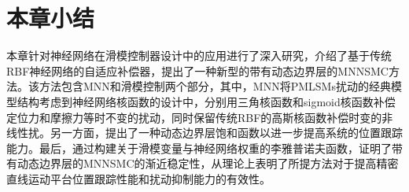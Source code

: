 \section{本章小结}
本章针对神经网络在滑模控制器设计中的应用进行了深入研究，介绍了基于传统RBF神经网络的自适应补偿器，提出了一种新型的带有动态边界层的MNNSMC方法。该方法包含MNN和滑模控制两个部分，其中，MNN将PMLSMs扰动的经典模型结构考虑到神经网络核函数的设计中，分别用三角核函数和sigmoid核函数补偿定位力和摩擦力等时不变的扰动，同时保留传统RBF的高斯核函数补偿时变的非线性扰。另一方面，提出了一种动态边界层饱和函数以进一步提高系统的位置跟踪能力。最后，通过构建关于滑模变量与神经网络权重的李雅普诺夫函数，证明了带有动态边界层的MNNSMC的渐近稳定性，从理论上表明了所提方法对于提高精密直线运动平台位置跟踪性能和扰动抑制能力的有效性。
